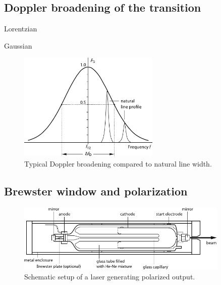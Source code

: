 % 



\subsection{Doppler broadening of the transition}

Lorentzian

Gaussian

\begin{figure}[H]
	\centering
	\includegraphics[width=0.60\textwidth]{content/graphics/broadening.pdf}
	\caption{Typical Doppler broadening compared to natural line width. \cite{Eichler_2018}}
	\label{fig:broadening}
\end{figure}



\subsection{Brewster window and polarization}

\begin{figure}[H]
	\centering
	\includegraphics[width=0.90\textwidth]{content/graphics/setup.pdf}
	\caption{Schematic setup of a \HeNe laser generating polarized output. \cite{Eichler_2018}}
	\label{fig:setup}
\end{figure}
